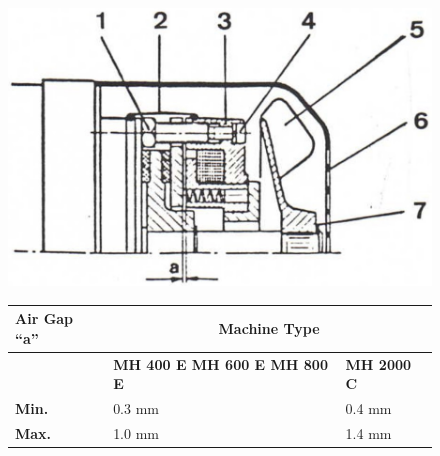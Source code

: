 \begin{figure}[H]
    \centering
    \begin{minipage}{0.48\textwidth}
        \centering
        \includegraphics[width=\textwidth]{images/chapter7/brake_adjustment.jpg}
        \label{fig:brake_adjustment}
    \end{minipage}
    \hfill
    \begin{minipage}{0.48\textwidth}
        \centering
        \renewcommand{\arraystretch}{1.2}
        \begin{tabular}{|p{}|p{}|p{}|}
            \hline
            \textbf{Air Gap \enquote{a}} & \multicolumn{2}{c|}{\textbf{Machine Type}} \\
            \hline
            & \textbf{MH 400 E MH 600 E MH 800 E} & \textbf{MH 2000 C} \\
            \hline
            \textbf{Min.} & 0.3 mm & 0.4 mm \\
            \hline
            \textbf{Max.} & 1.0 mm & 1.4 mm \\
            \hline
        \end{tabular}
    \end{minipage}
\end{figure}